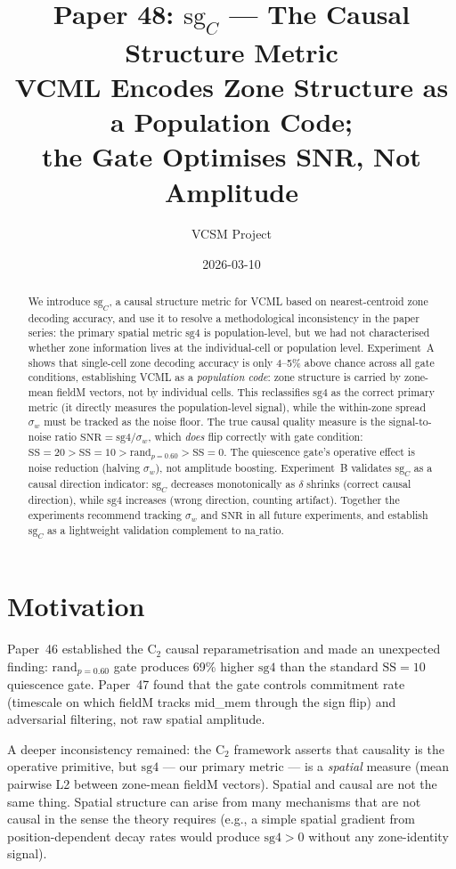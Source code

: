 \documentclass[11pt,a4paper]{article}
\title{\textbf{Paper 48: $\mathrm{sg}_C$ --- The Causal Structure Metric}\\
\large VCML Encodes Zone Structure as a Population Code;\\
the Gate Optimises SNR, Not Amplitude}
\author{VCSM Project}
\date{2026-03-10}
\begin{document}
\maketitle

\begin{abstract}
We introduce $\mathrm{sg}_C$, a causal structure metric for VCML based on
nearest-centroid zone decoding accuracy, and use it to resolve a methodological
inconsistency in the paper series: the primary spatial metric $\mathrm{sg4}$ is
population-level, but we had not characterised whether zone information lives at
the individual-cell or population level.  Experiment~A shows that single-cell
zone decoding accuracy is only 4--5\% above chance across all gate conditions,
establishing VCML as a \emph{population code}: zone structure is carried by
zone-mean fieldM vectors, not by individual cells.  This reclassifies
$\mathrm{sg4}$ as the correct primary metric (it directly measures the
population-level signal), while the within-zone spread $\sigma_w$ must be
tracked as the noise floor.  The true causal quality measure is the signal-to-noise
ratio $\mathrm{SNR} = \mathrm{sg4}/\sigma_w$, which \emph{does} flip correctly
with gate condition: $\mathrm{SS}{=}20 > \mathrm{SS}{=}10 > \mathrm{rand}_{p=0.60}
> \mathrm{SS}{=}0$.  The quiescence gate's operative effect is noise reduction
(halving $\sigma_w$), not amplitude boosting.  Experiment~B validates $\mathrm{sg}_C$
as a causal direction indicator: $\mathrm{sg}_C$ decreases monotonically as
$\delta$ shrinks (correct causal direction), while $\mathrm{sg4}$ increases
(wrong direction, counting artifact).  Together the experiments recommend
tracking $\sigma_w$ and $\mathrm{SNR}$ in all future experiments, and establish
$\mathrm{sg}_C$ as a lightweight validation complement to $\mathrm{na\_ratio}$.
\end{abstract}

\section{Motivation}

Paper~46 established the C$_2$ causal reparametrisation and made an unexpected
finding: $\mathrm{rand}_{p=0.60}$ gate produces 69\% higher $\mathrm{sg4}$ than
the standard $\mathrm{SS}{=}10$ quiescence gate.  Paper~47 found that the gate
controls commitment rate (timescale on which fieldM tracks mid\_mem through the
sign flip) and adversarial filtering, not raw spatial amplitude.

A deeper inconsistency remained: the C$_2$ framework asserts that causality is
the operative primitive, but $\mathrm{sg4}$ --- our primary metric --- is a
\emph{spatial} measure (mean pairwise L2 between zone-mean fieldM vectors).
Spatial and causal are not the same thing.  Spatial structure can arise from
many mechanisms that are not causal in the sense the theory requires (e.g., a
simple spatial gradient from position-dependent decay rates would produce
$\mathrm{sg4} > 0$ without any zone-identity signal).
\end{document}
